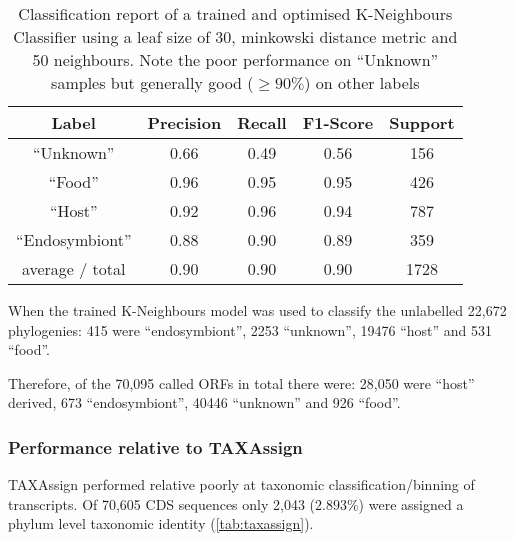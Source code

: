 \begin{table}
	\begin{tabular}{|c|c|c|c|c|}
		\hline
		\textbf{Label} & \textbf{Precision} & \textbf{Recall} & \textbf{F1-Score} & \textbf{Support} \\
		\hline
		``Unknown'' & 0.66 & 0.49 & 0.56 & 156 \\
		``Food'' & 0.96 & 0.95 & 0.95 & 426 \\
		``Host'' & 0.92 & 0.96 & 0.94 & 787 \\
		``Endosymbiont'' &  0.88 & 0.90 & 0.89 & 359 \\
		\hline
		average / total & 0.90 & 0.90 & 0.90 & 1728 \\
		\hline 
	\end{tabular}
\caption{Classification report of a trained and optimised 
	K-Neighbours Classifier using a leaf size of 30, minkowski
	distance metric and 50 neighbours.  Note the poor performance
	on ``Unknown'' samples but generally good (\(\geq90\%\)) on
	other labels}
\label{tab:classification_report}
\end{table} 

When the trained K-Neighbours model was used to classify 
the unlabelled 22,672 phylogenies: 415 were ``endosymbiont'',
2253 ``unknown'', 19476 ``host'' and 531 ``food''. 

Therefore, of the 70,095 called ORFs in total there were:
28,050 were ``host'' derived,  
673 ``endosymbiont'',  40446 ``unknown'' and 926 ``food''.

\subsubsection{Performance relative to TAXAssign}

TAXAssign performed relative poorly at taxonomic classification/binning
of transcripts.  Of 70,605 CDS sequences only
2,043 (\(2.893\%\)) were assigned a phylum level taxonomic identity (\cref{tab:taxassign}).

